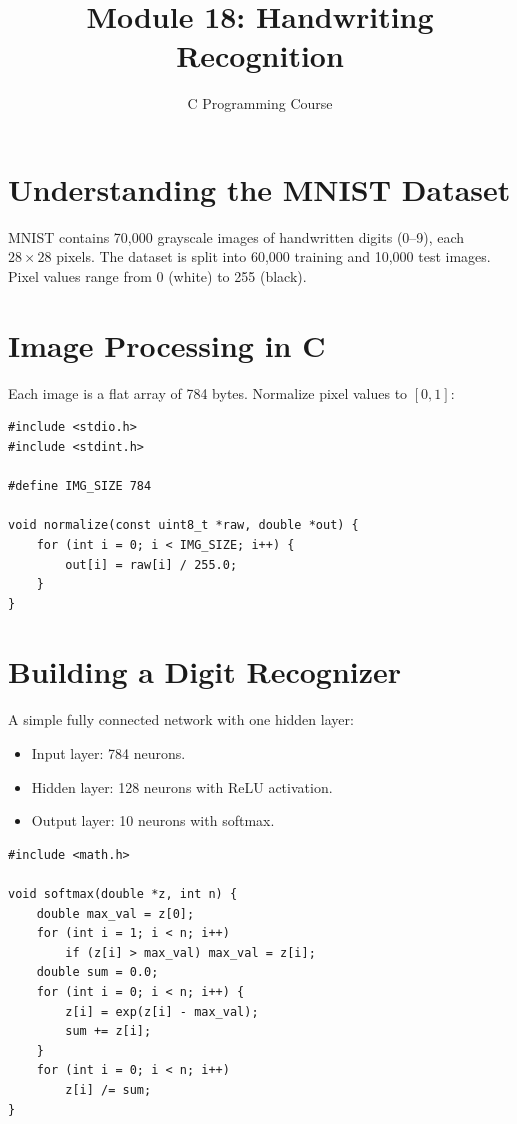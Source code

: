 \documentclass[11pt,a4paper]{article}
\title{Module 18: Handwriting Recognition}
\author{C Programming Course}
\date{}
\begin{document}
\maketitle
\thispagestyle{fancy}

\section{Understanding the MNIST Dataset}
MNIST contains 70,000 grayscale images of handwritten digits (0--9), each
$28 \times 28$ pixels. The dataset is split into 60,000 training and 10,000
test images. Pixel values range from 0 (white) to 255 (black).

\section{Image Processing in C}
Each image is a flat array of 784 bytes. Normalize pixel values to $[0, 1]$:

\begin{lstlisting}
#include <stdio.h>
#include <stdint.h>

#define IMG_SIZE 784

void normalize(const uint8_t *raw, double *out) {
    for (int i = 0; i < IMG_SIZE; i++) {
        out[i] = raw[i] / 255.0;
    }
}
\end{lstlisting}

\section{Building a Digit Recognizer}
A simple fully connected network with one hidden layer:
\begin{itemize}
  \item Input layer: 784 neurons.
  \item Hidden layer: 128 neurons with ReLU activation.
  \item Output layer: 10 neurons with softmax.
\end{itemize}

\begin{lstlisting}
#include <math.h>

void softmax(double *z, int n) {
    double max_val = z[0];
    for (int i = 1; i < n; i++)
        if (z[i] > max_val) max_val = z[i];
    double sum = 0.0;
    for (int i = 0; i < n; i++) {
        z[i] = exp(z[i] - max_val);
        sum += z[i];
    }
    for (int i = 0; i < n; i++)
        z[i] /= sum;
}
\end{lstlisting}
\end{document}
